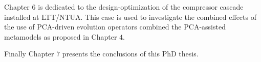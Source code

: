 Chapter $6$ is dedicated to the design-optimization of the compressor cascade installed at LTT/NTUA. This case is used to investigate the combined effects of the use of PCA-driven evolution operators combined the PCA-assisted metamodels as proposed in Chapter $4$.

Finally Chapter $7$ presents the conclusions of this PhD thesis.      









